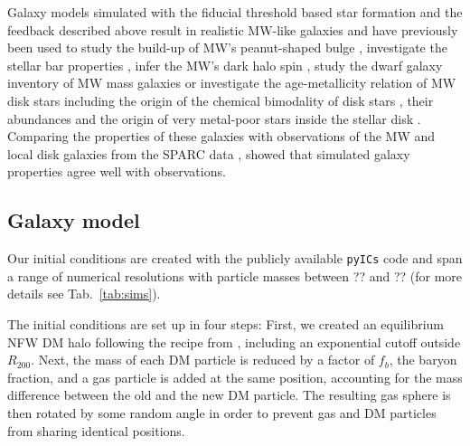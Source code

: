 \documentclass{aa}
\begin{document}
Galaxy models simulated with the fiducial threshold based star formation and the feedback described above result in realistic MW-like galaxies and have previously been used to study the build-up of MW's peanut-shaped bulge \citep{Buck2018,Buck2019b}, investigate the stellar bar properties \citep{Hilmi2020}, infer the MW's dark halo spin \citep{Obreja2022}, study the dwarf galaxy inventory of MW mass galaxies \citep{Buck2019} or investigate the age-metallicity relation of MW disk stars \citep{Lu2022,Buck2023} including the origin of the chemical bimodality of disk stars \citep{Buck2020}, their abundances \citep{Lu2022a} and the origin of very metal-poor stars inside the stellar disk \citep{Sestito2021}.
Comparing the properties of these galaxies with observations of the MW and local disk galaxies from the SPARC data \citep{Lelli2016}, \citet{Buck2020a} showed that simulated galaxy properties agree well with observations.


\subsection{Galaxy model}
Our initial conditions are created with the publicly available \texttt{pyICs} code \citep{Herpich2017} and span a range of numerical resolutions with particle masses between ?? and ?? (for more details see Tab.~\ref{tab:sims}). 

The initial conditions are set up in four steps: First, we
created an equilibrium NFW DM halo \citep{Navarro1996}
following the recipe from \cite{Kazantzidis2004}, including
an exponential cutoff outside $R_{200}$. Next, the mass
of each DM particle is reduced by a factor of $f_b$, the baryon
fraction, and a gas particle is added at the same position,
accounting for the mass difference between the old and the
new DM particle. The resulting gas sphere is then rotated by some random angle in order to prevent gas and DM particles from sharing identical
positions.
\end{document}
